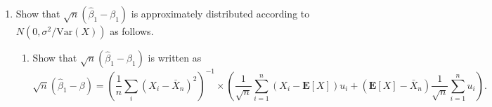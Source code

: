 \documentclass[11pt]{article}
\newcommand{\Blue}{\color{blue}}
\begin{document}
\begin{enumerate}
\begin{enumerate}
	\item Show that $\sqrt{n}(\hat\beta_1-\beta_1)$ is approximately distributed according to $N(0,\sigma^2/\text{Var}(X))$  as follows.
	\begin{enumerate}
	\item Show that $\sqrt{n}(\hat\beta_1-\beta_1)$ is written as
	\[
	\sqrt{n}(\hat\beta_1-\beta) = \left(\frac{1}{n}\sum_i (X_i-\bar X_n)^2\right)^{-1} \times \left(\frac{1}{\sqrt{n}} \sum_{i=1}^n (X_i-\mathbf{E}[X])u_i + ( \mathbf{E}[X]  -\bar X_n)\frac{1}{\sqrt{n}} \sum_{i=1}^n u_i \right).
	\]



\end{enumerate}
\end{enumerate}
\end{enumerate}
\end{document}
